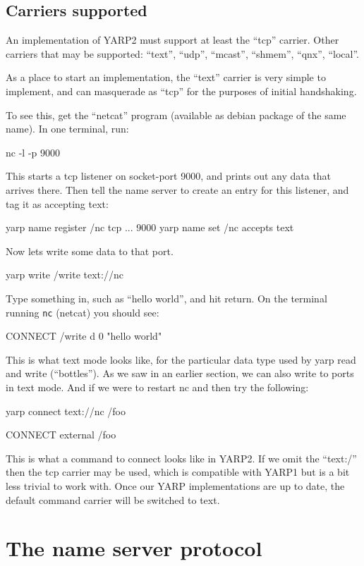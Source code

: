 \documentclass[a4]{article}
\begin{document}


\subsection{Carriers supported}

An implementation of YARP2 must support at least the ``tcp'' carrier.
Other carriers that may be supported:
``text'', ``udp'', ``mcast'', ``shmem'', ``qnx'', ``local''.

As a place to start an implementation, the ``text'' carrier is very
simple to implement, and can masquerade as ``tcp'' for the purposes
of initial handshaking.

To see this, get the ``netcat'' program (available as debian package
of the same name).  In one terminal, run:
%
\begin{code}
nc -l -p 9000
\end{code}
%
This starts a tcp listener on socket-port 9000, and prints out
any data that arrives there.  Then tell the name server to
create an entry for this listener, and tag it as accepting text:
%
\begin{code}
yarp name register /nc tcp ... 9000
yarp name set /nc accepts text
\end{code}
%
Now lets write some data to that port.
%
\begin{code}
yarp write /write text://nc
\end{code}
%
Type something in, such as ``hello world'', and hit return.
On the terminal running {\tt nc} (netcat) you should see:
%
\begin{code}
CONNECT /write
d
0 "hello world"
\end{code}
%
This is what text mode looks like, for the particular
data type used by yarp read and write (``bottles'').  
As we saw in an earlier section, we can also write to ports in text mode.
And if we were to restart nc and then try the following:
%
\begin{code}
yarp connect text://nc /foo
\end{code}
%
\begin{code}
CONNECT external
/foo
\end{code}
%
This is what a command to connect looks like in YARP2.  If we omit the
``text:/'' then the tcp carrier may be used, which is compatible with YARP1
but is a bit less trivial to work with.  Once our YARP implementations
are up to date, the default command carrier will be switched to text.



\section{The name server protocol}
\end{document}
